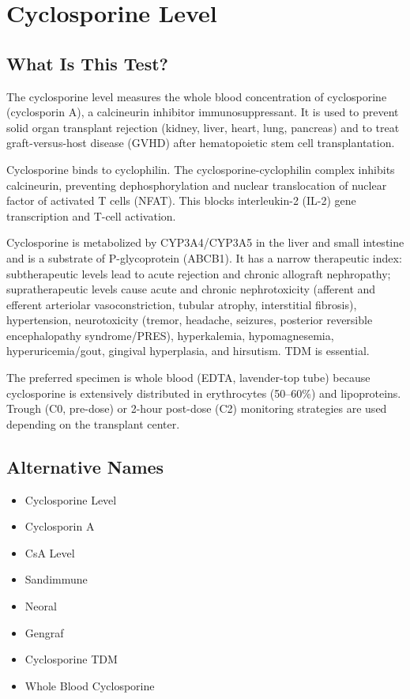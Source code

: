 \chapter{Cyclosporine Level}

\section*{What Is This Test?}
The cyclosporine level measures the whole blood concentration of cyclosporine (cyclosporin A), a calcineurin inhibitor immunosuppressant. It is used to prevent solid organ transplant rejection (kidney, liver, heart, lung, pancreas) and to treat graft-versus-host disease (GVHD) after hematopoietic stem cell transplantation.

Cyclosporine binds to cyclophilin. The cyclosporine-cyclophilin complex inhibits calcineurin, preventing dephosphorylation and nuclear translocation of nuclear factor of activated T cells (NFAT). This blocks interleukin-2 (IL-2) gene transcription and T-cell activation.

Cyclosporine is metabolized by CYP3A4/CYP3A5 in the liver and small intestine and is a substrate of P-glycoprotein (ABCB1). It has a narrow therapeutic index: subtherapeutic levels lead to acute rejection and chronic allograft nephropathy; supratherapeutic levels cause acute and chronic nephrotoxicity (afferent and efferent arteriolar vasoconstriction, tubular atrophy, interstitial fibrosis), hypertension, neurotoxicity (tremor, headache, seizures, posterior reversible encephalopathy syndrome/PRES), hyperkalemia, hypomagnesemia, hyperuricemia/gout, gingival hyperplasia, and hirsutism. TDM is essential. \cite{kahan2004therapeutic}

The preferred specimen is whole blood (EDTA, lavender-top tube) because cyclosporine is extensively distributed in erythrocytes (50--60\%) and lipoproteins. Trough (C0, pre-dose) or 2-hour post-dose (C2) monitoring strategies are used depending on the transplant center.

\section*{Alternative Names}
\begin{itemize}
  \item Cyclosporine Level
  \item Cyclosporin A
  \item CsA Level
  \item Sandimmune
  \item Neoral
  \item Gengraf
  \item Cyclosporine TDM
  \item Whole Blood Cyclosporine
\end{itemize}
